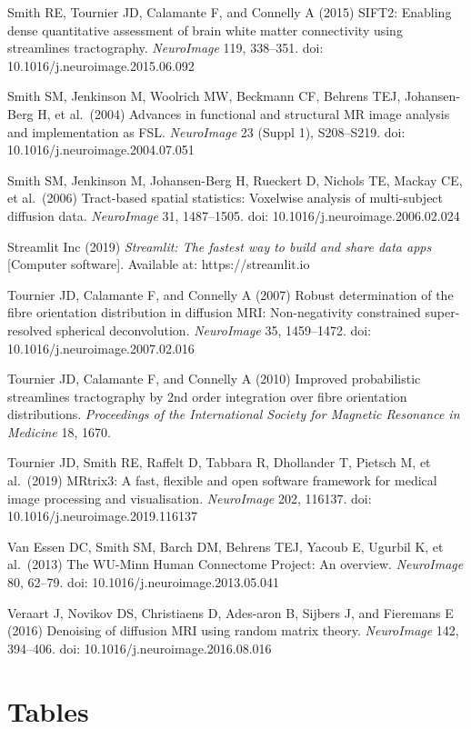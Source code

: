 \documentclass[12pt,a4paper]{article}
\begin{document}
Smith RE, Tournier JD, Calamante F, and Connelly A (2015) SIFT2: Enabling dense quantitative assessment of brain white matter connectivity using streamlines tractography. \emph{NeuroImage} 119, 338--351. doi: 10.1016/j.neuroimage.2015.06.092

Smith SM, Jenkinson M, Woolrich MW, Beckmann CF, Behrens TEJ, Johansen-Berg H, et al.~(2004) Advances in functional and structural MR image analysis and implementation as FSL. \emph{NeuroImage} 23 (Suppl 1), S208--S219. doi: 10.1016/j.neuroimage.2004.07.051

Smith SM, Jenkinson M, Johansen-Berg H, Rueckert D, Nichols TE, Mackay CE, et al.~(2006) Tract-based spatial statistics: Voxelwise analysis of multi-subject diffusion data. \emph{NeuroImage} 31, 1487--1505. doi: 10.1016/j.neuroimage.2006.02.024

Streamlit Inc (2019) \emph{Streamlit: The fastest way to build and share data apps} {[}Computer software{]}. Available at: https://streamlit.io

Tournier JD, Calamante F, and Connelly A (2007) Robust determination of the fibre orientation distribution in diffusion MRI: Non-negativity constrained super-resolved spherical deconvolution. \emph{NeuroImage} 35, 1459--1472. doi: 10.1016/j.neuroimage.2007.02.016

Tournier JD, Calamante F, and Connelly A (2010) Improved probabilistic streamlines tractography by 2nd order integration over fibre orientation distributions. \emph{Proceedings of the International Society for Magnetic Resonance in Medicine} 18, 1670.

Tournier JD, Smith RE, Raffelt D, Tabbara R, Dhollander T, Pietsch M, et al.~(2019) MRtrix3: A fast, flexible and open software framework for medical image processing and visualisation. \emph{NeuroImage} 202, 116137. doi: 10.1016/j.neuroimage.2019.116137

Van Essen DC, Smith SM, Barch DM, Behrens TEJ, Yacoub E, Ugurbil K, et al.~(2013) The WU-Minn Human Connectome Project: An overview. \emph{NeuroImage} 80, 62--79. doi: 10.1016/j.neuroimage.2013.05.041

Veraart J, Novikov DS, Christiaens D, Ades-aron B, Sijbers J, and Fieremans E (2016) Denoising of diffusion MRI using random matrix theory. \emph{NeuroImage} 142, 394--406. doi: 10.1016/j.neuroimage.2016.08.016

\section{Tables}\label{tables}
\end{document}
